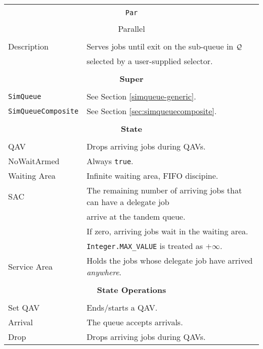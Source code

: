 \begin{tabular}{|l|l|}
	\hline
	\multicolumn{2}{|c|}{} \\
	\multicolumn{2}{|c|}{\lstinline[basicstyle=\large]{Par}} \\
	\multicolumn{2}{|c|}{} \\
	\multicolumn{2}{|c|}{Parallel} \\
	\multicolumn{2}{|c|}{} \\
	\hline
	Description & Serves jobs until exit on the sub-queue in $\cal{Q}$ \\
	& selected by a user-supplied selector. \\
	\hline
	\multicolumn{2}{|c|}{} \\
	\multicolumn{2}{|c|}{\bf Super} \\
	\multicolumn{2}{|c|}{} \\
	\hline
	\lstinline|SimQueue| & See Section \ref{simqueue-generic}. \\
	\lstinline|SimQueueComposite| & See Section \ref{sec:simqueuecomposite}. \\
	\hline
	\multicolumn{2}{|c|}{} \\
	\multicolumn{2}{|c|}{\bf State} \\
	\multicolumn{2}{|c|}{} \\
	\hline
	QAV & Drops arriving jobs during QAVs. \\
	\hline
	NoWaitArmed & Always \lstinline|true|. \\
	\hline
	Waiting Area & Infinite waiting area, FIFO discipine. \\
	\hline
	SAC & The remaining number of arriving jobs that can have a delegate job \\
	& arrive at the tandem queue. \\
	& If zero, arriving jobs wait in the waiting area. \\
	& \lstinline|Integer.MAX_VALUE| is treated as $+\infty$. \\
	\hline
	Service Area & Holds the jobs whose delegate job have arrived {\em anywhere}. \\
	\hline
	\multicolumn{2}{|c|}{} \\
	\multicolumn{2}{|c|}{\bf State Operations} \\
	\multicolumn{2}{|c|}{} \\
	\hline
	Set QAV & Ends/starts a QAV. \\
	\hline
	Arrival & The queue accepts arrivals. \\
	\hline
	Drop & Drops arriving jobs during QAVs. \\

\end{tabular}

